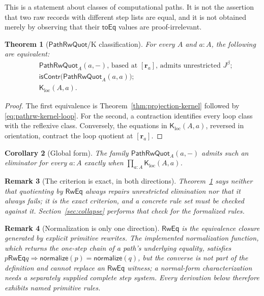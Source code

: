 \documentclass[10pt,reqno]{amsart}
\newtheorem{theorem}{Theorem}[section]
\newtheorem{corollary}[theorem]{Corollary}
\newtheorem{remark}[theorem]{Remark}
\newcommand{\isContr}{\mathsf{isContr}}
\newcommand{\PRW}{\mathsf{PathRwQuot}}
\newcommand{\LocalK}{\mathsf K_{\mathrm{loc}}}
\begin{document}
This is a statement about classes of computational paths.  It is not the
assertion that two raw records with different step lists are equal, and
it is not obtained merely by observing that their \(\mathsf{toEq}\) values are
proof-irrelevant.

\begin{theorem}[\(\mathsf{PathRwQuot}\)/K classification]
\label{thm:pathrw-k}
For every \(A\) and \(a:A\), the following are equivalent:
\[
\begin{split}
 &\text{\(\PRW_A(a,-)\), based at \([\mathbf r_a]\), admits
 unrestricted \(J^\beta\);}\\
 &\isContr\bigl(\PRW_A(a,a)\bigr);\\
 &\LocalK(A,a).
\end{split}
\tag{10.6}\label{eq:pathrw-k}
\]
\end{theorem}

\begin{proof}
The first equivalence is Theorem~\ref{thm:projection-kernel} followed by
\eqref{eq:pathrw-kernel-loop}.  For the second, a contraction identifies every
loop class with the reflexive class.  Conversely, the equations in
\(\LocalK(A,a)\), reversed in orientation, contract the loop quotient at
\([\mathbf r_a]\).
\end{proof}

\begin{corollary}[Global form]
\label{cor:pathrw-global-k}
The family \(\PRW_A(a,-)\) admits such an eliminator for every \(a:A\) exactly
when \(\prod_{a:A}\LocalK(A,a)\).
\end{corollary}

\begin{remark}[The criterion is exact, in both directions]
\label{rem:rweq-no-slogan}
Theorem~\ref{thm:pathrw-k} says neither that quotienting by \(\mathsf{RwEq}\)
always repairs unrestricted elimination nor that it always fails; it is the
exact criterion, and a concrete rule set must be checked against it.
Section~\ref{sec:collapse} performs that check for the formalized rules.
\end{remark}

\begin{remark}[Normalization is only one direction]
\label{rem:rweq-normalization}
\(\mathsf{RwEq}\) is the equivalence closure generated by explicit primitive
rewrites.  The implemented normalization function, which returns the one-step
chain of a path's underlying equality, satisfies
\(p\mathrel{\mathsf{RwEq}}q\Rightarrow\mathsf{normalize}(p)=\mathsf{normalize}(q)\),
but the converse is not part of the definition and cannot replace an
\(\mathsf{RwEq}\) witness; a normal-form characterization needs a separately
supplied complete step system.  Every derivation below therefore exhibits named
primitive rules.
\end{remark}
\end{document}
